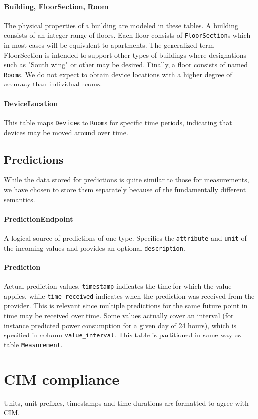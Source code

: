 \paragraph{Building, FloorSection, Room}
The physical properties of a building are modeled in these tables. A building consists of an integer range of floors. Each floor consists of \texttt{FloorSection}s which in most cases will be equivalent to apartments. The generalized term FloorSection is intended to support other types of buildings where designations such as "South wing" or other may be desired. Finally, a floor consists of named \texttt{Room}s. We do not expect to obtain device locations with a higher degree of accuracy than individual rooms.

\paragraph{DeviceLocation} This table maps \texttt{Device}s to \texttt{Room}s for specific time periods, indicating that devices may be moved around over time.

\subsection{Predictions}
While the data stored for predictions is quite similar to those for measurements, we have chosen to store them separately because of the fundamentally different semantics.

\paragraph{PredictionEndpoint} 
A logical source of predictions of one type. Specifies the \texttt{attribute} and \texttt{unit} of the incoming values and provides an optional \texttt{description}.

\paragraph{Prediction}
Actual prediction values. \texttt{timestamp} indicates the time for which the value applies, while \texttt{time\_received} indicates when the prediction was received from the provider. This is relevant since multiple predictions for the same future point in time may be received over time. Some values actually cover an interval (for instance predicted power consumption for a given day of 24 hours), which is specified in column \texttt{value\_interval}.
This table is partitioned in same way as table \texttt{Measurement}.


\section{CIM compliance}
Units, unit prefixes, timestamps and time durations are formatted to agree with CIM.

